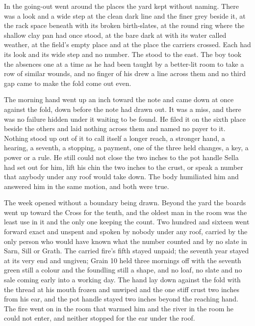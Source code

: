 In  the going-out went around the places the yard kept without naming. There was a look and a wide step at the clean dark line and the finer grey beside it, at the rack space beneath  with its broken birth-slates, at the round ring where the shallow clay pan had once stood, at the bare dark  at  with its water called weather, at the field's empty place and at the place the carriers crossed. Each had its look and its wide step and no number. The  stood to the east. The boy took the absences one at a time as he had been taught by a better-lit room to take a row of similar wounds, and no finger of his drew a line across them and no third gap came to make the fold come out even.

\scenebreak

The morning hand went up an inch toward the note and came down at once against the fold, down before the note had drawn out. It was a miss, and there was no failure hidden under it waiting to be found. He filed it on the sixth place beside the others and laid nothing across them and named no payer to it. Nothing stood up out of it to call itself a longer reach, a stronger hand, a hearing, a seventh, a stopping, a payment, one of the three held changes, a key, a power or a rule. He still could not close the two inches to the pot handle Sella had set out for him, lift his chin the two inches to the crust, or speak a number that anybody under any roof would take down. The body humiliated him and answered him in the same motion, and both were true.

The week opened without a boundary being drawn. Beyond the yard the boards went up  toward the Cross for the tenth, and the oldest man in the room was the least use in it and the only one keeping the count. Two hundred and sixteen went forward exact and unspent and spoken by nobody under any roof, carried by the only person who would have known what the number counted and by no slate in Sarn, Sill or Grath. The carried fire's fifth stayed unpaid; the seventh year stayed at its very end and ungiven; Grain 10 held three mornings off with the seventh green still a colour and the foundling still a shape, and no loaf, no slate and no sale coming early into a working day. The hand lay down against the fold with the thread at his mouth frozen and unwiped and the one stiff crust two inches from his ear, and the pot handle stayed two inches beyond the reaching hand. The fire went on in the room that warmed him and the river in the room he could not enter, and neither stopped for the ear under the roof.
